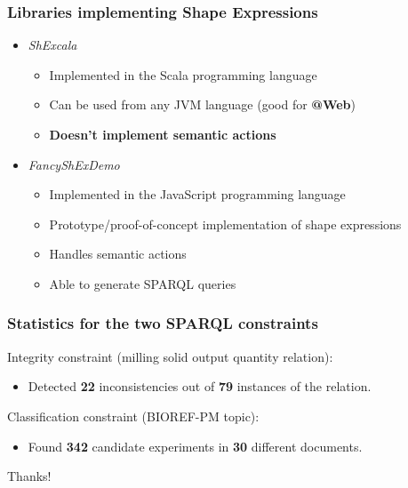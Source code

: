 \documentclass{beamer}
\makeatletter
\newcommand{\atweb}{\textbf{@Web}\xspace}
\makeatother
\begin{document}
\begin{frame}
  \frametitle{Libraries implementing Shape Expressions}

  \begin{itemize}
    \item \textit{ShExcala}

    \pause

    \begin{itemize}
      \item Implemented in the Scala programming language

      \pause

      \item Can be used from any JVM language (good for \atweb)

      \pause

      \item \textbf{Doesn't implement semantic actions}
    \end{itemize}

    \pause

    \item \textit{FancyShExDemo}

    \pause

    \begin{itemize}
      \item Implemented in the JavaScript programming language

      \pause

      \item Prototype/proof-of-concept implementation of shape expressions

      \pause

      \item Handles semantic actions

      \pause

      \item Able to generate SPARQL queries
    \end{itemize}
  \end{itemize}
\end{frame}

\begin{frame}
  \frametitle{Statistics for the two SPARQL constraints}

  \pause

  Integrity constraint (milling solid output quantity relation):

  \pause

  \begin{itemize}
    \item Detected \textbf{22} inconsistencies out of \textbf{79} instances of
      the relation.
  \end{itemize}

  \pause

  Classification constraint (BIOREF-PM topic):

  \pause

  \begin{itemize}
    \item Found \textbf{342} candidate experiments in \textbf{30} different
      documents.
  \end{itemize}
\end{frame}

\begin{frame}
  \begin{center}
    \Huge{Thanks!}
  \end{center}
\end{frame}
\end{document}
